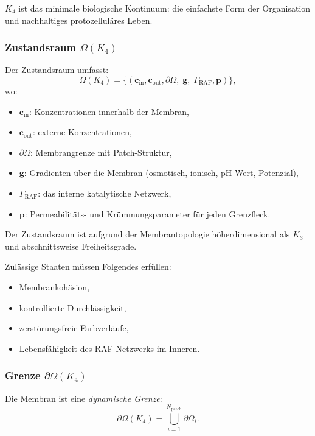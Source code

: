 $K_4$ ist das minimale biologische Kontinuum: die einfachste Form der Organisation
und nachhaltiges protozelluläres Leben.

\subsubsection{Zustandsraum \texorpdfstring{$\Omega(K_4)$}{\Omega(K_4)}}

Der Zustandsraum umfasst:
\[
\Omega(K_4) =
\{(\mathbf{c}_{\mathrm{in}},\mathbf{c}_{\mathrm{out}},
  \partial\Omega,\; \mathbf{g},\; \Gamma_{\mathrm{RAF}},
  \mathbf{p})\},
\]
wo:
\begin{itemize}
    \item $\mathbf{c}_{\mathrm{in}}$: Konzentrationen innerhalb der Membran,
    \item $\mathbf{c}_{\mathrm{out}}$: externe Konzentrationen,
    \item $\partial\Omega$: Membrangrenze mit Patch-Struktur,
    \item $\mathbf{g}$: Gradienten über die Membran (osmotisch, ionisch,
          pH-Wert, Potenzial),
    \item $\Gamma_{\mathrm{RAF}}$: das interne katalytische Netzwerk,
    \item $\mathbf{p}$: Permeabilitäts- und Krümmungsparameter für jeden
          Grenzfleck.
\end{itemize}

Der Zustandsraum ist aufgrund der Membrantopologie höherdimensional als $K_3$
und abschnittsweise Freiheitsgrade.

Zulässige Staaten müssen Folgendes erfüllen:
\begin{itemize}
    \item Membrankohäsion,
    \item kontrollierte Durchlässigkeit,
    \item zerstörungsfreie Farbverläufe,
    \item Lebensfähigkeit des RAF-Netzwerks im Inneren.
\end{itemize}

\subsubsection{Grenze \texorpdfstring{$\partial\Omega(K_4)$}{\partial\Omega(K_4)}}

Die Membran ist eine \emph{dynamische Grenze}:
\[
\partial\Omega(K_4) = \bigcup_{i=1}^{N_{\mathrm{patch}}}
    \partial\Omega_i.
\]

